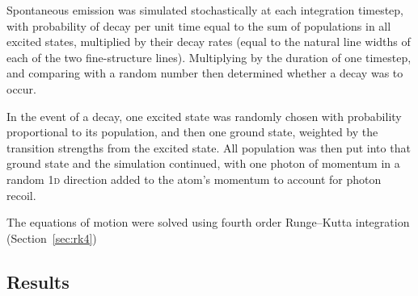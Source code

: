 Spontaneous emission was simulated stochastically at each integration timestep, with probability of decay per unit time equal to the sum of populations in all excited states, multiplied by their decay rates (equal to the natural line widths of each of the two fine-structure lines). Multiplying by the duration of one timestep, and comparing with a random number then determined whether a decay was to occur.

In the event of a decay, one excited state was randomly chosen with probability proportional to its population, and then one ground state, weighted by the transition strengths from the excited state. All population was then put into that ground state and the simulation continued, with one photon of momentum in a random \textsc{1d} direction added to the atom's momentum to account for photon recoil.

The equations of motion were solved using fourth order Runge--Kutta integration (Section~\ref{sec:rk4})

\subsection{Results}

\begin{table}
    \renewcommand{\arraystretch}{1.5}
    \setlength\heavyrulewidth{1.5pt}
    \caption{The parameters used in the laser cooling simulations. There are four lasers, each with a specified polarisation, intensity, and detuning from the transition it targets.}\label{table:numbers}
\end{table}

